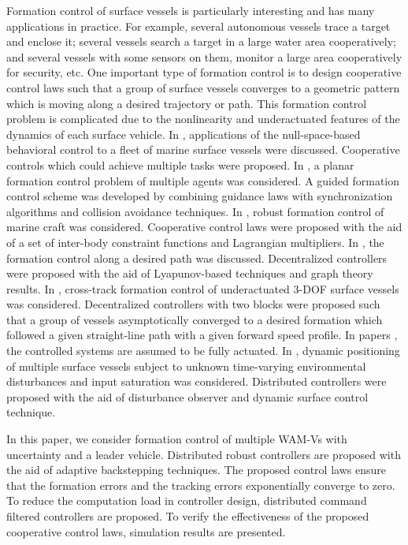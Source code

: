 \documentclass[letterpaper, 10 pt, conference]{ieeeconf}  %
\begin{document}
Formation control of surface vessels is particularly interesting and
has many applications in practice. For example, several autonomous vessels trace a target and enclose it; several vessels search a target in a large water area cooperatively; and several vessels with some sensors on them, monitor a large area cooperatively for security, etc.
One important type of
formation control  is to design cooperative control
laws such that a group of surface vessels converges to a  geometric
pattern which is moving along a desired trajectory or path. This formation control problem is complicated due to the nonlinearity and underactuated features of 
the dynamics of each surface vehicle.  In
\cite{arr06,arr061}, applications of the null-space-based behavioral
control to a fleet of marine surface vessels were discussed.
Cooperative controls which could achieve multiple tasks were
proposed. In \cite{bre06}, a planar formation control problem of
multiple agents was considered. A guided formation control scheme
was developed by combining guidance laws with synchronization
algorithms and collision avoidance techniques. In \cite{ihl06},
robust formation control of marine craft was considered. Cooperative
control laws were proposed with the aid of a set of inter-body
constraint functions and Lagrangian multipliers.
 In \cite{agu06}, the formation control along a desired path was
 discussed. Decentralized controllers were proposed with the aid of
 Lyapunov-based techniques and graph
theory results.  In \cite{bor06}, cross-track formation control of
underactuated 3-DOF surface vessels was considered. Decentralized
controllers with two blocks were proposed such that a group of
vessels asymptotically converged to a desired formation which
followed a given straight-line path with a given forward speed
profile. In papers \cite{arr06,arr061,bre06,ihl06}, the controlled
systems are assumed to be fully actuated. In \cite{Xia2019}, dynamic positioning of multiple surface vessels subject to unknown time-varying environmental disturbances and input saturation was considered. Distributed controllers were proposed with the aid of disturbance observer and dynamic surface control technique.


In this paper, we consider formation control of multiple WAM-Vs with uncertainty and a leader vehicle. Distributed robust controllers are proposed with the aid of adaptive backstepping techniques. 
The proposed control laws ensure that the formation errors and the tracking errors exponentially converge to zero. To reduce the computation load in controller design, distributed command filtered controllers are proposed.  To verify the effectiveness of the proposed
cooperative control laws, simulation results are presented.
\end{document}
